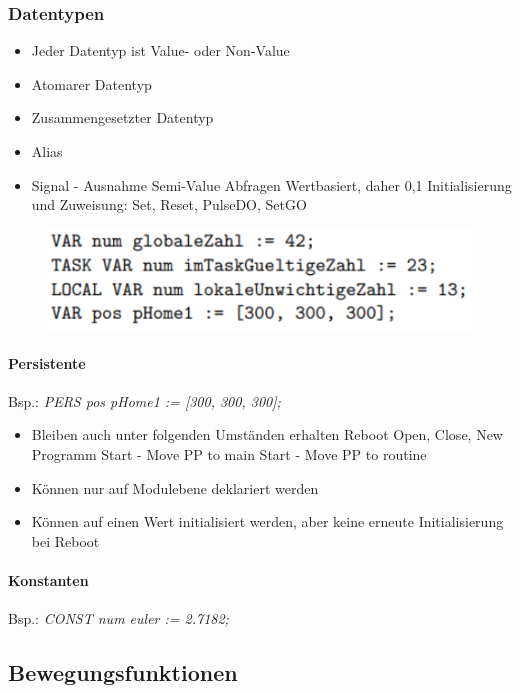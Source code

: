\subsubsection{Datentypen}
\begin{itemize}
	\item Jeder Datentyp ist Value- oder Non-Value
	\item Atomarer Datentyp
	\item Zusammengesetzter Datentyp
	\item Alias
	\item Signal - Ausnahme Semi-Value
	\subitem Abfragen Wertbasiert, daher 0,1 
	\subitem Initialisierung und Zuweisung: Set, Reset, PulseDO, SetGO
\end{itemize}
\begin{figure}[]
	\begin{center}
		\includegraphics[]{resources/PNG/syntax8.PNG}
		\caption{}
		\label{fig:resources/PNG/syntax8.PNG}
	\end{center}
\end{figure}
\paragraph{Persistente}
Bsp.: \textit{PERS pos pHome1 := [300, 300, 300];}
\begin{itemize}
	\item Bleiben auch unter folgenden Umständen erhalten
	\subitem Reboot
	\subitem Open, Close, New Programm
	\subitem Start - Move PP to main
	\subitem Start - Move PP to routine
\end{itemize}
\begin{itemize}
	\item Können nur auf Modulebene deklariert werden
	\item Können auf einen Wert initialisiert werden, aber keine erneute Initialisierung bei Reboot
\end{itemize}
\paragraph{Konstanten}
Bsp.: \textit{CONST num euler := 2.7182;}
\subsection{Bewegungsfunktionen}
